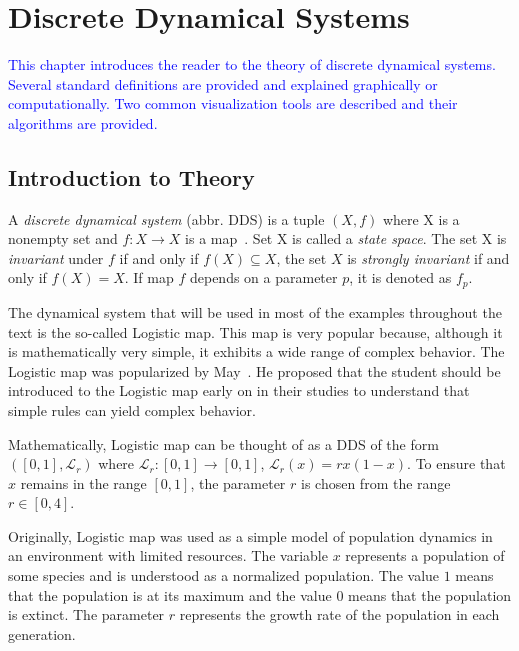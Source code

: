 \chapter{Discrete Dynamical Systems}

\textcolor{blue}{
This chapter introduces the reader to the theory of discrete dynamical systems.
Several standard definitions are provided and explained graphically or computationally.
Two common visualization tools are described and their algorithms are provided.
}

\section{Introduction to Theory}

\begin{definition}
    A \emph{discrete dynamical system} (abbr. DDS) is a tuple $\left( X, f \right)$ where X is a nonempty set and $f: X \rightarrow X$ is a map~\emph{\cite{Brin20100706}}.
    Set X is called a \emph{state space}.
    The set X is \emph{invariant} under $f$ if and only if $f(X) \subseteq X$, the set $X$ is \emph{strongly invariant} if and only if $f(X) = X$.
    If map $f$ depends on a parameter $p$, it is denoted as $f_p$.
\end{definition}

\begin{remark}
    The dynamical system that will be used in most of the examples throughout the text is the so-called Logistic map.
    This map is very popular because, although it is mathematically very simple, it exhibits a wide range of complex behavior.
    The Logistic map was popularized by May~\cite{May19760610}.
    He proposed that the student should be introduced to the Logistic map early on in their studies to understand that simple rules can yield complex behavior.
    \par
    Mathematically, Logistic map can be thought of as a DDS of the form $\left( [0, 1], \mathcal{L}_{r} \right)$ where $\mathcal{L}_{r}: [0,1] \rightarrow [0,1]$, $\mathcal{L}_{r}(x) = rx(1-x)$.
    To ensure that $x$ remains in the range $[0,1]$, the parameter $r$ is chosen from the range $r \in [0, 4]$.
    \par
    Originally, Logistic map was used as a simple model of population dynamics in an environment with limited resources.
    The variable $x$ represents a population of some species and is understood as a normalized population.
    The value $1$ means that the population is at its maximum and the value $0$ means that the population is extinct.
    The parameter $r$ represents the growth rate of the population in each generation. \cite{Strogatz201854}
\end{remark}


